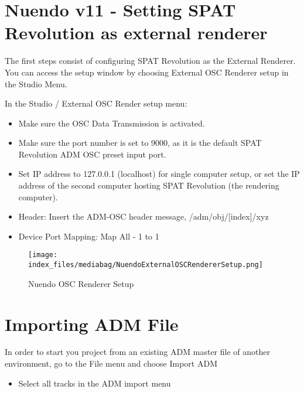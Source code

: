 \documentclass[
  letterpaper,
  DIV=11,
  numbers=noendperiod]{scrreport}
\providecommand{\tightlist}{%
  \setlength{\itemsep}{0pt}\setlength{\parskip}{0pt}}\usepackage{longtable,booktabs,array}
\begin{document}
\hypertarget{nuendo-v11---setting-spat-revolution-as-external-renderer}{%
\section{Nuendo v11 - Setting SPAT Revolution as external
renderer}\label{nuendo-v11---setting-spat-revolution-as-external-renderer}}

The first steps consist of configuring SPAT Revolution as the External
Renderer. You can access the setup window by choosing External OSC
Renderer setup in the Studio Menu.

In the Studio / External OSC Render setup menu:

\begin{itemize}
\tightlist
\item
  Make sure the OSC Data Transmission is activated.
\item
  Make sure the port number is set to 9000, as it is the default SPAT
  Revolution ADM OSC preset input port.
\item
  Set IP address to 127.0.0.1 (localhost) for single computer setup, or
  set the IP address of the second computer hosting SPAT Revolution (the
  rendering computer).
\item
  Header: Insert the ADM-OSC header message, /adm/obj/{[}index{]}/xyz
\item
  Device Port Mapping: Map All - 1 to 1
\end{itemize}

\begin{figure}

{\centering \texttt{[image: index\_files/mediabag/NuendoExternalOSCRendererSetup.png]}

}

\caption{Nuendo OSC Renderer Setup}

\end{figure}

\hypertarget{importing-adm-file}{%
\section{Importing ADM File}\label{importing-adm-file}}

In order to start you project from an existing ADM master file of
another environment, go to the File menu and choose Import ADM

\begin{itemize}
\tightlist
\item
  Select all tracks in the ADM import menu
\end{itemize}
\end{document}
